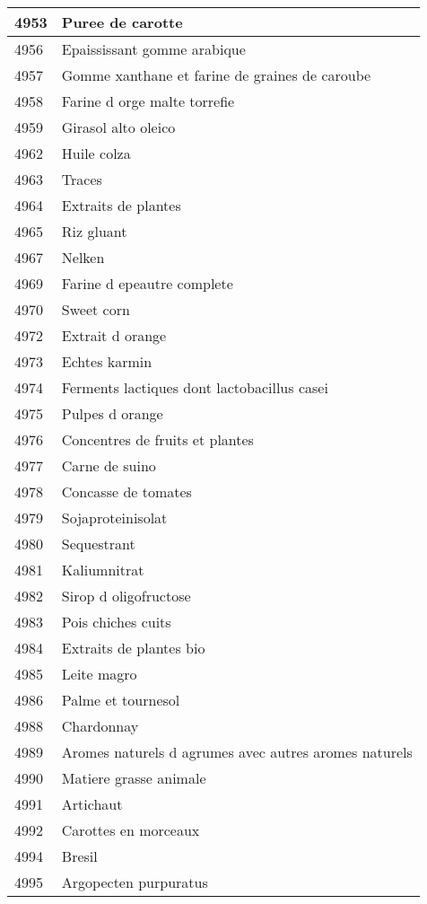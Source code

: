 \begin{longtable}{|l|l|}
4953 & Puree de carotte \\ \hline 
4956 & Epaississant gomme arabique \\ \hline 
4957 & Gomme xanthane et farine de graines de caroube \\ \hline 
4958 & Farine d orge malte torrefie \\ \hline 
4959 & Girasol alto oleico \\ \hline 
4962 & Huile colza \\ \hline 
4963 & Traces \\ \hline 
4964 & Extraits de plantes \\ \hline 
4965 & Riz gluant \\ \hline 
4967 & Nelken \\ \hline 
4969 & Farine d epeautre complete \\ \hline 
4970 & Sweet corn \\ \hline 
4972 & Extrait d orange \\ \hline 
4973 & Echtes karmin \\ \hline 
4974 & Ferments lactiques dont lactobacillus casei \\ \hline 
4975 & Pulpes d orange \\ \hline 
4976 & Concentres de fruits et plantes \\ \hline 
4977 & Carne de suino \\ \hline 
4978 & Concasse de tomates \\ \hline 
4979 & Sojaproteinisolat \\ \hline 
4980 & Sequestrant \\ \hline 
4981 & Kaliumnitrat \\ \hline 
4982 & Sirop d oligofructose \\ \hline 
4983 & Pois chiches cuits \\ \hline 
4984 & Extraits de plantes bio \\ \hline 
4985 & Leite magro \\ \hline 
4986 & Palme et tournesol \\ \hline 
4988 & Chardonnay \\ \hline 
4989 & Aromes naturels d agrumes avec autres aromes naturels \\ \hline 
4990 & Matiere grasse animale \\ \hline 
4991 & Artichaut \\ \hline 
4992 & Carottes en morceaux \\ \hline 
4994 & Bresil \\ \hline 
4995 & Argopecten purpuratus \\ \hline 

\end{longtable}

